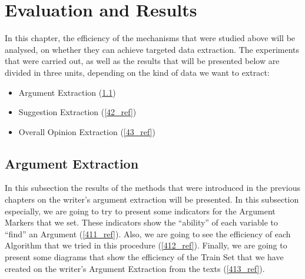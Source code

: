 \chapter{Evaluation and Results}
In this chapter, the efficiency of the mechanisms that were studied above will be analysed, on whether they can achieve targeted data extraction. The experiments that were carried out, as well as the results that will be presented below are divided in three units, depending on the kind of data we want to extract:\\
\begin{itemize}

	\item Argument Extraction (\ref{41_ref})
	\item Suggestion Extraction (\ref{42_ref})
	\item Overall Opinion Extraction (\ref{43_ref})

\end{itemize}
\section{Argument Extraction}\label{41_ref}
In this subsection the results of the methods that were introduced in the previous chapters on the writer's argument extraction will be presented. In this subsection especially, we are going to try to present some indicators for the Argument Markers that we set. These indicators show the ``ability'' of each variable to ``find'' an Argument (\ref{411_ref}). Also, we are going to see the efficiency of each Algorithm that we tried in this procedure (\ref{412_ref}). Finally, we are going to present some diagrams that show the efficiency of the Train Set that we have created on the writer's Argument Extraction from the texts (\ref{413_ref}).


